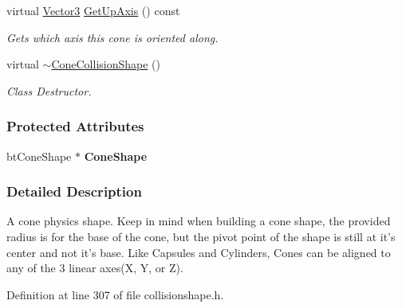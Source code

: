 \begin{DoxyCompactItemize}
\item 
virtual \hyperlink{classphys_1_1Vector3}{Vector3} \hyperlink{classphys_1_1ConeCollisionShape_a1d391d17d1a7ba4e156fe24717175898}{GetUpAxis} () const 
\begin{DoxyCompactList}\small\item\em Gets which axis this cone is oriented along. \item\end{DoxyCompactList}\item 
\hypertarget{classphys_1_1ConeCollisionShape_ae0516f6da6334790c2052ae926a7739b}{
virtual \hyperlink{classphys_1_1ConeCollisionShape_ae0516f6da6334790c2052ae926a7739b}{$\sim$ConeCollisionShape} ()}
\label{classphys_1_1ConeCollisionShape_ae0516f6da6334790c2052ae926a7739b}

\begin{DoxyCompactList}\small\item\em Class Destructor. \item\end{DoxyCompactList}\end{DoxyCompactItemize}
\subsubsection*{Protected Attributes}
\begin{DoxyCompactItemize}
\item 
\hypertarget{classphys_1_1ConeCollisionShape_aa1c4ebb55fee225796012e51425d06ef}{
btConeShape $\ast$ {\bfseries ConeShape}}
\label{classphys_1_1ConeCollisionShape_aa1c4ebb55fee225796012e51425d06ef}

\end{DoxyCompactItemize}


\subsubsection{Detailed Description}
A cone physics shape. Keep in mind when building a cone shape, the provided radius is for the base of the cone, but the pivot point of the shape is still at it's center and not it's base. Like Capsules and Cylinders, Cones can be aligned to any of the 3 linear axes(X, Y, or Z). 

Definition at line 307 of file collisionshape.h.




